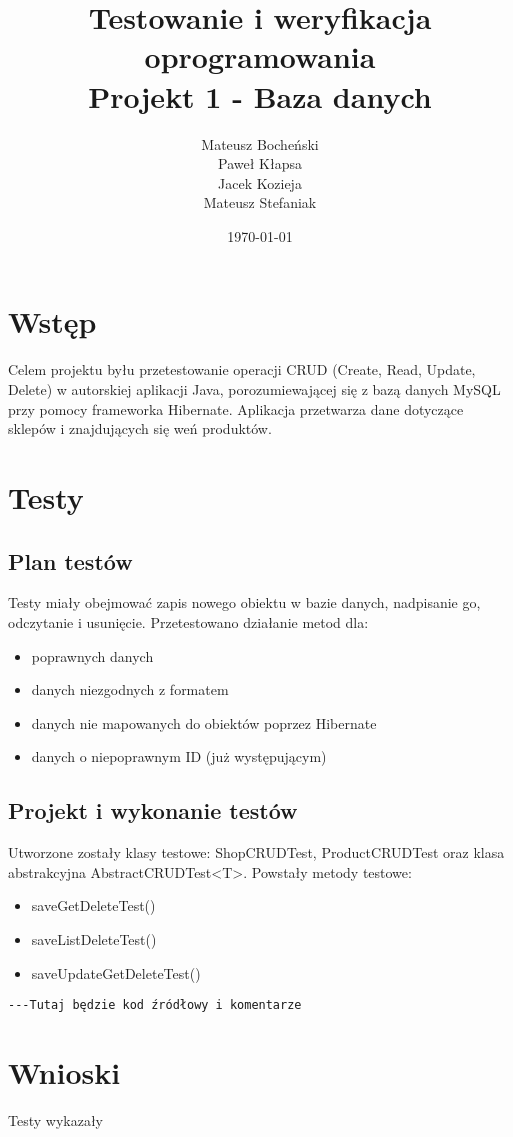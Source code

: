 \documentclass[a4paper,11pt,notitlepage]{article}
\author{Mateusz Bocheński\\Paweł Kłapsa\\Jacek Kozieja\\Mateusz Stefaniak}
\title{Testowanie i weryfikacja oprogramowania \\ {\small Projekt 1 - Baza danych}}
\date{\today}
\begin{document}
\maketitle
\tableofcontents

\section{Wstęp}
Celem projektu byłu przetestowanie operacji CRUD (Create, Read, Update, Delete) w autorskiej aplikacji Java, porozumiewającej się z bazą danych MySQL przy pomocy frameworka Hibernate. Aplikacja przetwarza dane dotyczące sklepów i znajdujących się weń produktów.
\section{Testy}
\subsection{Plan testów}
Testy miały obejmować zapis nowego obiektu w bazie danych, nadpisanie go, odczytanie i usunięcie. Przetestowano działanie metod dla:
\begin{itemize}
  \item poprawnych danych
  \item danych niezgodnych z formatem
  \item danych nie mapowanych do obiektów poprzez Hibernate
  \item danych o niepoprawnym ID (już występującym)
\end{itemize}

\subsection{Projekt i wykonanie testów}
Utworzone zostały klasy testowe: ShopCRUDTest, ProductCRUDTest oraz klasa abstrakcyjna AbstractCRUDTest<T>. Powstały metody testowe:
\begin{itemize}
  \item saveGetDeleteTest()
  \item saveListDeleteTest()
  \item saveUpdateGetDeleteTest()
\end{itemize}

\begin{footnotesize}\begin{verbatim}
---Tutaj będzie kod źródłowy i komentarze
\end{verbatim}\end{footnotesize}

\section{Wnioski}
Testy wykazały
\end{document}
